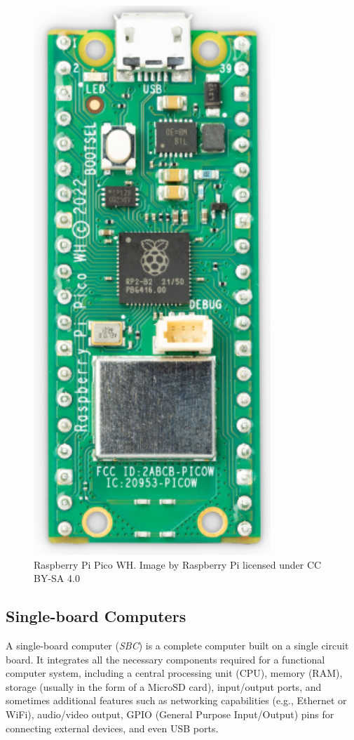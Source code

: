 \begin{figure}[h]
\begin{minipage}[b]{0.45\textwidth}
        \includegraphics[width=.6\textwidth]{Imagenes/Vectorial/piPicoWH.pdf}
        \caption{Raspberry Pi Pico WH. Image by Raspberry Pi licensed under CC BY-SA 4.0}
        \label{fig:piPicoWH}
    \end{minipage}
\end{figure}


%
%
\subsection{Single-board Computers}

A single-board computer (\textit{SBC}) is a complete computer built on a single circuit board. It integrates all 
the necessary components required for a functional computer system, including a central processing unit (CPU), 
memory (RAM), storage (usually in the form of a MicroSD card), input/output ports, and sometimes additional 
features such as networking capabilities (e.g., Ethernet or WiFi), audio/video output, GPIO (General Purpose 
Input/Output) pins for connecting external devices, and even USB ports.

